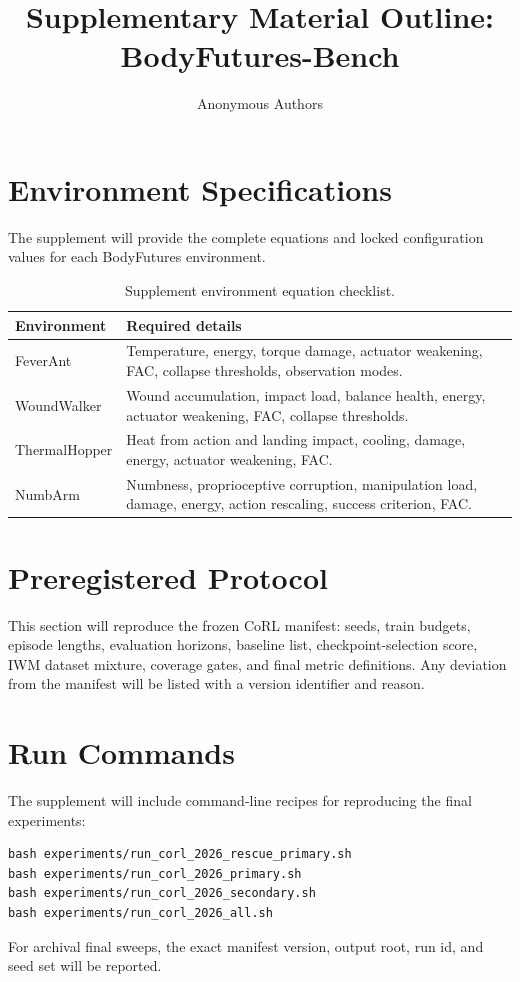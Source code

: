 \documentclass{article}
\title{Supplementary Material Outline: BodyFutures-Bench}
\author{Anonymous Authors}
\begin{document}
\maketitle

\section{Environment Specifications}

The supplement will provide the complete equations and locked configuration
values for each BodyFutures environment.

\begin{table}[h]
\centering
\caption{Supplement environment equation checklist.}
\begin{tabularx}{\linewidth}{lX}
\toprule
Environment & Required details \\
\midrule
FeverAnt & Temperature, energy, torque damage, actuator weakening, FAC,
collapse thresholds, observation modes. \\
WoundWalker & Wound accumulation, impact load, balance health, energy,
actuator weakening, FAC, collapse thresholds. \\
ThermalHopper & Heat from action and landing impact, cooling, damage,
energy, actuator weakening, FAC. \\
NumbArm & Numbness, proprioceptive corruption, manipulation load,
damage, energy, action rescaling, success criterion, FAC. \\
\bottomrule
\end{tabularx}
\end{table}

\section{Preregistered Protocol}

This section will reproduce the frozen CoRL manifest:
seeds, train budgets, episode lengths, evaluation horizons, baseline list,
checkpoint-selection score, IWM dataset mixture, coverage gates, and final
metric definitions.  Any deviation from the manifest will be listed with a
version identifier and reason.

\section{Run Commands}

The supplement will include command-line recipes for reproducing the final
experiments:
\begin{verbatim}
bash experiments/run_corl_2026_rescue_primary.sh
bash experiments/run_corl_2026_primary.sh
bash experiments/run_corl_2026_secondary.sh
bash experiments/run_corl_2026_all.sh
\end{verbatim}
For archival final sweeps, the exact manifest version, output root, run id,
and seed set will be reported.
\end{document}
